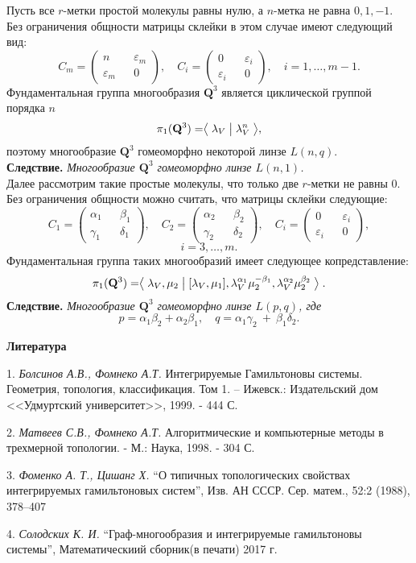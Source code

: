 Пусть все $r$-метки простой молекулы равны нулю, а $n$-метка не равна $0, 1, -1$.
Без ограничения общности матрицы склейки в этом случае имеют следующий вид:
$$
C_m = \begin{pmatrix} n && \varepsilon_m \\ \varepsilon_m && 0 \end{pmatrix}, \quad C_i = \begin{pmatrix} 0 && \varepsilon_i \\ \varepsilon_i && 0 \end{pmatrix},\quad i = 1,\dots, m-1.
$$
Фундаментальная группа многообразия $\mathbf{Q}^3$ является циклической группой порядка $n$
$$
\pi_1(\mathbf{Q}^3) = \bigm\langle \lambda_V \bigm| \lambda_V^n \bigm\rangle,
$$
поэтому многообразие $\mathbf{Q}^3$ гомеоморфно некоторой линзе $L(n, q)$.
\\

\textbf{Следствие.}{ \it
Многообразие $\mathbf{Q}^3$ гомеоморфно линзе $L(n, 1)$.}
\\

Далее рассмотрим такие простые молекулы, что только две $r$-метки не равны 0.
Без ограничения общности можно считать, что матрицы склейки следующие:
$$
C_1 = \begin{pmatrix} \alpha_1 && \beta_1 \\ \gamma_1 && \delta_1 \end{pmatrix}, \quad
C_2 = \begin{pmatrix} \alpha_2 && \beta_2 \\ \gamma_2 && \delta_2 \end{pmatrix},
\quad C_i = \begin{pmatrix} 0 && \varepsilon_i \\ \varepsilon_i && 0 \end{pmatrix},
$$
$$
i = 3,\dots, m.
$$
Фундаментальная группа таких многообразий имеет следующее копредставление:
$$
\pi_1(\mathbf{Q}^3) = \bigm\langle \lambda_V, \mu_2 \bigm|  [\lambda_V, \mu_1],
\lambda^{\alpha_1}_V\mu^{-\beta_1}_2, \lambda^{\alpha_2}_V\mu^{\beta_2}_2 \bigm\rangle.
$$
\textbf{Следствие.} {\it
Многообразие $\mathbf{Q}^3$ гомеоморфно линзе $L(p, q)$, где
$$
p = \alpha_1\beta_2 + \alpha_2\beta_1, \quad q = \alpha_1\gamma_2~+~\beta_1\delta_2.
$$
}
\smallskip \centerline{\bf Литература}\nopagebreak

1. {\it Болсинов А.В., Фомнеко А.Т.}  Интегрируемые Гамильтоновы системы. Геометрия, топология, классификация. Том 1. -- Ижевск.: Издательский дом <<Удмуртский университет>>, 1999. - 444 С.

2. {\it Матвеев С.В., Фомнеко А.Т.} Алгоритмические и компьютерные методы в трехмерной топологии.  - М.: Наука, 1998. - 304 С.

3. {\it Фоменко А. Т., Цишанг Х.} “О типичных топологических свойствах интегрируемых гамильтоновых систем”, Изв. АН СССР. Сер. матем., 52:2 (1988), 378–407

4. {\it Солодских К. И.} “Граф-многообразия и интегрируемые гамильтоновы системы”, Математическиий сборник(в печати) 2017 г.


